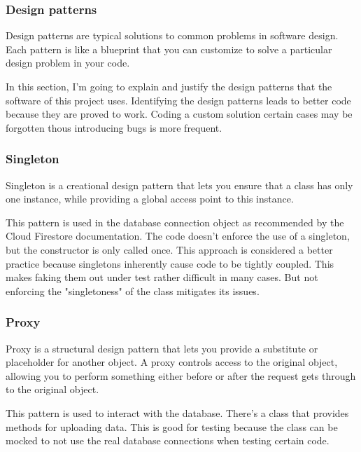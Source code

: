 \clearpage\newpage
\subsubsection{Design patterns}
\label{sec:patterns}

Design patterns are typical solutions to common problems in software design. Each pattern is like a blueprint that you can customize to solve a particular design problem in your code.\cite{refactoring-guru}

In this section, I'm going to explain and justify the design patterns that the software of this project uses. Identifying the design patterns leads to better code because they are proved to work. Coding a custom solution certain cases may be forgotten thous introducing bugs is more frequent.

\subsubsection*{Singleton}

Singleton is a creational design pattern that lets you ensure that a class has only one instance, while providing a global access point to this instance.\cite{refactoring-guru-singleton}

This pattern is used in the database connection object as recommended by the Cloud Firestore documentation\cite{firestore-doc-init}. The code doesn't enforce the use of a singleton, but the constructor is only called once. This approach is considered a better practice because singletons inherently cause code to be tightly coupled. This makes faking them out under test rather difficult in many cases. But not enforcing the "singletoness" of the class mitigates its issues.

\subsubsection*{Proxy}

Proxy is a structural design pattern that lets you provide a substitute or placeholder for another object. A proxy controls access to the original object, allowing you to perform something either before or after the request gets through to the original object.\cite{refactoring-guru-proxy}

This pattern is used to interact with the database. There's a class that provides methods for uploading data. This is good for testing because the class can be mocked to not use the real database connections when testing certain code.

